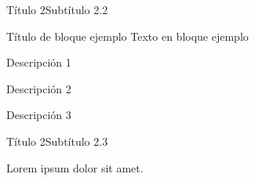 \documentclass[aspectratio=169,14pt,spanish]{beamer}
\begin{document}
    \begin{frame}{Título 2}{Subtítulo 2.2}
        \begin{exampleblock}{Título de bloque ejemplo}
            Texto en bloque ejemplo
        \end{exampleblock}

        \begin{description}[<+->]
            \item [Primer ítem] Descripción 1
            \item [Segundo ítem] Descripción 2
            \item [Tercer ítem] Descripción 3
        \end{description}
    \end{frame}

    \begin{frame}{Título 2}{Subtítulo 2.3}
        \begin{overlayarea}{\textwidth}{3cm}
             {Lorem ipsum dolor sit amet.}
        \end{overlayarea}
    \end{frame}
\end{document}
